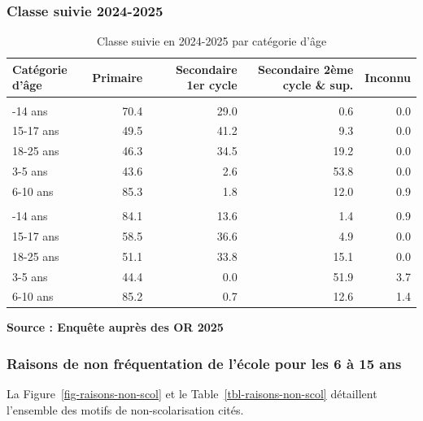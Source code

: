 \documentclass[
  french,
  letterpaper,
]{report}
\begin{document}
\subsubsection{Classe suivie 2024-2025}\label{classe-suivie-2024-2025}

\begin{table}
\caption*{
{\fontsize{20}{25}\selectfont  Classe suivie en 2024-2025 par catégorie d'âge\fontsize{12}{15}\selectfont }
} 
\fontsize{12.0pt}{14.0pt}\selectfont
\begin{tabular*}{\linewidth}{@{\extracolsep{\fill}}lrrrr}
\toprule
Catégorie d'âge & {\bfseries {Primaire}} & {\bfseries {Secondaire 1er cycle}} & Secondaire 2ème cycle \& sup. & {\bfseries {Inconnu}} \\ 
\midrule\addlinespace[2.5pt]
\multicolumn{5}{l}{{\bfseries {Alaotra}}} \\[2.5pt] 
\midrule\addlinespace[2.5pt]
11-14 ans & 70.4 & 29.0 & 0.6 & 0.0 \\ 
15-17 ans & 49.5 & 41.2 & 9.3 & 0.0 \\ 
18-25 ans & 46.3 & 34.5 & 19.2 & 0.0 \\ 
3-5 ans & 43.6 & 2.6 & 53.8 & 0.0 \\ 
6-10 ans & 85.3 & 1.8 & 12.0 & 0.9 \\ 
\midrule\addlinespace[2.5pt]
\multicolumn{5}{l}{{\bfseries {Marovoay}}} \\[2.5pt] 
\midrule\addlinespace[2.5pt]
11-14 ans & 84.1 & 13.6 & 1.4 & 0.9 \\ 
15-17 ans & 58.5 & 36.6 & 4.9 & 0.0 \\ 
18-25 ans & 51.1 & 33.8 & 15.1 & 0.0 \\ 
3-5 ans & 44.4 & 0.0 & 51.9 & 3.7 \\ 
6-10 ans & 85.2 & 0.7 & 12.6 & 1.4 \\ 
\bottomrule
\end{tabular*}
\begin{minipage}{\linewidth}
\textbf{Source : Enquête auprès des OR 2025}\\
\end{minipage}
\end{table}

\subsubsection{Raisons de non fréquentation de l'école pour les 6 à 15
ans}\label{raisons-de-non-fruxe9quentation-de-luxe9cole-pour-les-6-uxe0-15-ans}

La Figure~\ref{fig-raisons-non-scol} et le
Table~\ref{tbl-raisons-non-scol} détaillent l'ensemble des motifs de
non-scolarisation cités.
\end{document}
